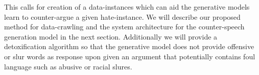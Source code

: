 This calls for creation of a data-instances which can aid the generative models learn to counter-argue a given hate-instance. We will describe our proposed method for data-crawling and the system architecture for the counter-speech generation model in the next section. Additionally we will provide a detoxification algorithm so that the generative model does not provide offensive or slur words as response upon given an argument that potentially contains foul language such as abusive or racial slures.




